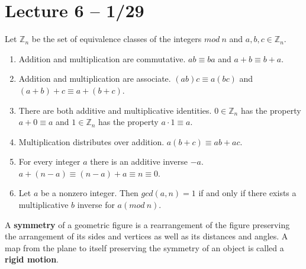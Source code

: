 \documentclass{article}
\newcommand{\Z}{\mathbb{Z}}
\begin{document}
\section{Lecture 6 -- 1/29}
\begin{definition}
  Let $\Z_n$ be the set of equivalence classes of the integers $mod\ n$ and $a,b,c\in\Z_n$.

  \begin{enumerate}
    \item Addition and multiplication are commutative. $ab\equiv ba$ and $a+b\equiv b+a$.
    \item Addition and multiplication are associate. $(ab)c\equiv a(bc)$ and $(a+b)+c\equiv a+(b+c)$.
    \item There are both additive and multiplicative identities. $0\in \Z_n$ has the property $a+0\equiv a$ and $1\in \Z_n$ has the property $a\cdot1\equiv a$.
    \item Multiplication distributes over addition. $a(b+c)\equiv ab+ac$.
    \item For every integer $a$ there is an additive inverse $-a$. $a+(n-a)\equiv (n-a)+a\equiv n\equiv0$.
    \item Let $a$ be a nonzero integer. Then $gcd(a,n)=1$ if and only if there exists a multiplicative $b$ inverse for $a(mod\ n)$.
  \end{enumerate}
\end{definition}
\begin{definition}
  A \textbf{symmetry} of a geometric figure is a rearrangement of the figure preserving the arrangement of its sides and vertices as well as its distances and angles. A map from the plane to itself preserving the symmetry of an object is called a \textbf{rigid motion}.
\end{definition}
\end{document}

